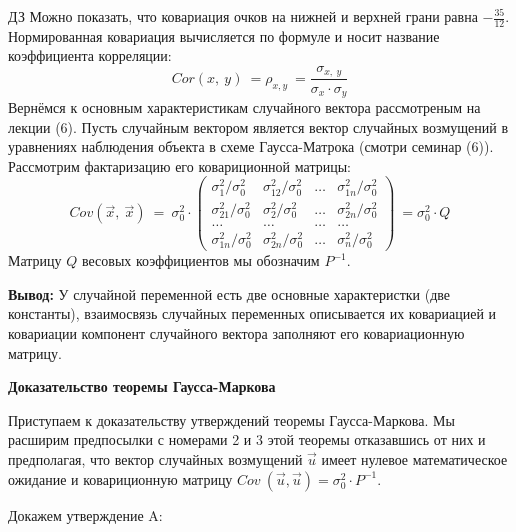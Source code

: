 \documentclass[12pt,a4paper]{article}
\begin{document}
$\displaystyle \boxed{\text{ДЗ}}$ Можно показать, что ковариация очков на нижней и верхней грани равна $\displaystyle -\frac{35}{12}$. Нормированная ковариация вычисляется по формуле и носит название коэффициента корреляции:
\begin{equation*}
Cor( x,\ y) \ =\rho _{x,y} \ =\frac{\sigma _{x,\ y}}{\sigma _{x} \cdot \sigma _{y}}
\end{equation*}
Вернёмся к основным характеристикам случайного вектора рассмотреным на лекции (6). Пусть случайным вектором является вектор случайных возмущений в уравнениях наблюдения объекта в схеме Гаусса-Матрока (смотри семинар (6)). Рассмотрим фактаризацию его ковариционной матрицы:
\begin{equation*}
Cov\left(\vec{x} ,\ \vec{x}\right) \ =\ \sigma ^{2}_{0} \cdot \begin{pmatrix}
\sigma ^{2}_{1} /\sigma ^{2}_{0} & \sigma ^{2}_{12} /\sigma ^{2}_{0} & \dotsc  & \sigma ^{2}_{1n} /\sigma ^{2}_{0}\\
\sigma ^{2}_{21} /\sigma ^{2}_{0} & \sigma ^{2}_{2} /\sigma ^{2}_{0} & \dotsc  & \sigma ^{2}_{2n} /\sigma ^{2}_{0}\\
\dotsc  & \dotsc  & \dotsc  & \dotsc \\
\sigma ^{2}_{1n} /\sigma ^{2}_{0} & \sigma ^{2}_{2n} /\sigma ^{2}_{0} & \dotsc  & \sigma ^{2}_{n} /\sigma ^{2}_{0}
\end{pmatrix} \ =\sigma ^{2}_{0} \cdot Q
\end{equation*}
Матрицу $\displaystyle Q$ весовых коэффициентов мы обозначим $\displaystyle P^{-1}$.

\textbf{Вывод: }У случайной переменной есть две основные характеристки (две константы), взаимосвязь случайных переменных описывается их ковариацией и ковариации компонент случайного вектора заполняют его ковариационную матрицу.
\begin{center}
\textbf{Доказательство теоремы Гаусса-Маркова}
\end{center}
Приступаем к доказательству утверждений теоремы Гаусса-Маркова. Мы расширим предпосылки с номерами 2 и 3 этой теоремы отказавшись от них и предполагая, что вектор случайных возмущений $\displaystyle \vec{u}$ имеет нулевое математическое ожидание и ковариционную матрицу $\displaystyle Cov\ \left(\vec{u} ,\vec{u}\right) =\sigma ^{2}_{0} \cdot P^{-1}$.

Докажем утверждение A:
\end{document}
